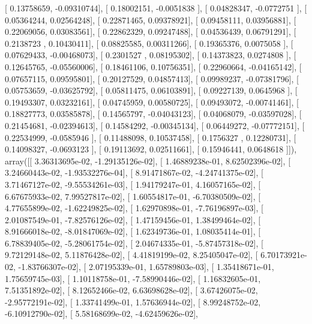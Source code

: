 \documentclass{article}
\begin{document}
       [ 0.13758659, -0.09310744],
       [ 0.18002151, -0.0051838 ],
       [ 0.04828347, -0.0772751 ],
       [ 0.05364244,  0.02564248],
       [ 0.22871465,  0.09378921],
       [ 0.09458111,  0.03956881],
       [ 0.22069056,  0.03083561],
       [ 0.22862329,  0.09247488],
       [ 0.04536439,  0.06791291],
       [ 0.2138723 ,  0.10430411],
       [ 0.08825585,  0.00311266],
       [ 0.19365376,  0.0075058 ],
       [ 0.07629433, -0.00468073],
       [ 0.2301527 ,  0.08195302],
       [ 0.14373823,  0.0274808 ],
       [ 0.12645765, -0.05560006],
       [ 0.18461106,  0.10756351],
       [ 0.22960664, -0.04165142],
       [ 0.07657115,  0.09595801],
       [ 0.20127529,  0.04857413],
       [ 0.09989237, -0.07381796],
       [ 0.05753659, -0.03625792],
       [ 0.05811475,  0.06103891],
       [ 0.09227139,  0.0645968 ],
       [ 0.19493307,  0.03232161],
       [ 0.04745959,  0.00580725],
       [ 0.09493072, -0.00741461],
       [ 0.18827773,  0.03585878],
       [ 0.14565797, -0.04043123],
       [ 0.04068079, -0.03597028],
       [ 0.21454681, -0.02394613],
       [ 0.14584292, -0.00345134],
       [ 0.06449272, -0.07772151],
       [ 0.22534999, -0.0585946 ],
       [ 0.11488098,  0.10537458],
       [ 0.1756327 ,  0.12280731],
       [ 0.14098327, -0.0693123 ],
       [ 0.19113692,  0.02511661],
       [ 0.15946441,  0.0648618 ]]), array([[  3.36313695e-02,  -1.29135126e-02],
       [  1.46889238e-01,   8.62502396e-02],
       [  3.24660443e-02,  -1.93532276e-04],
       [  8.91471867e-02,  -4.24741375e-02],
       [  3.71467127e-02,  -9.55534261e-03],
       [  1.94179247e-01,   4.16057165e-02],
       [  6.67675933e-02,   7.99527817e-02],
       [  1.60554817e-01,  -6.70380509e-02],
       [  4.77655899e-02,  -1.62249825e-02],
       [  1.62970898e-01,  -7.76196897e-03],
       [  2.01087549e-01,  -7.82576126e-02],
       [  1.47159456e-01,   1.38499464e-02],
       [  8.91666018e-02,  -8.01847069e-02],
       [  1.62349736e-01,   1.08035414e-01],
       [  6.78839405e-02,  -5.28061754e-02],
       [  2.04674335e-01,  -5.87457318e-02],
       [  9.72129148e-02,   5.11876428e-02],
       [  4.41819199e-02,   8.25405047e-02],
       [  6.70173921e-02,  -1.83766307e-02],
       [  2.07195339e-01,   1.65789803e-03],
       [  1.35418671e-01,   1.75659745e-03],
       [  1.10118758e-01,  -7.58990446e-02],
       [  1.16832605e-01,   7.51351892e-02],
       [  8.12652466e-02,   6.63698628e-02],
       [  3.67426075e-02,  -2.95772191e-02],
       [  1.33741499e-01,   1.57636944e-02],
       [  8.99248752e-02,  -6.10912790e-02],
       [  5.58168699e-02,  -4.62459626e-02],
\end{document}
